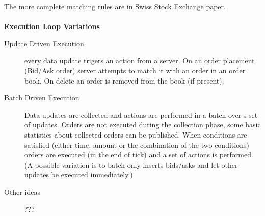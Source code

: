 \documentclass{article}
\begin{document}
The more complete matching rules are in Swiss Stock Exchange paper.
\\
\\
{\bf Execution Loop Variations}

\begin{description}
    \item[Update Driven Execution] every data update trigers an action from a server. On an order placement (Bid/Ask order) server attempts to match it with an order in an order book. On delete an order is removed from the book (if present).
    \item[Batch Driven Execution] Data updates are collected and actions are performed in a batch over s set of updates. Orders are not executed during the collection phase, some basic statistics about collected orders can be published. When conditions are satisfied (either time, amount or the combination of the two conditions) orders are executed (in the end of tick) and a set of actions is performed. (A possible variation is to batch only inserts bids/asks and let other updates be executed immediately.)
    \item[Other ideas] ???
\end{description}
\end{document}
